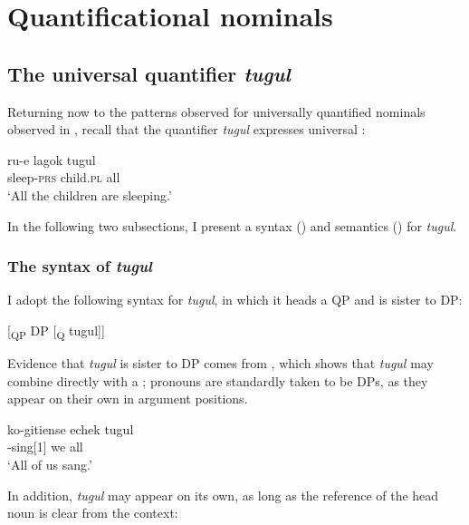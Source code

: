 \documentclass[output=paper]{LSP/langsci}
\begin{document}
\section{Quantificational nominals}
\label{sec:landman:qnominals}

\subsection{The universal quantifier \textit{tugul}}
Returning now to the patterns observed for universally quantified nominals observed in , recall that the quantifier \textit{tugul} expresses universal : 

\begin{exe}
     \gll ru-e lagok tugul \\
          sleep-\textsc{prs} child.\textsc{pl} all\\ 
     \glt ‘All the children are sleeping.’
\end{exe}

 In the following two subsections, I present a syntax () and semantics () for \textit{tugul}.

\subsubsection{The syntax of \textit{tugul}}
\label{sec:landman:tugulsyn}
\noindent I adopt the following syntax for \textit{tugul}, in which it heads a QP and is sister to DP:  

\ea \label{ex:landman:tugultree}
[\textsubscript{QP} DP [\textsubscript{Q} tugul]]  %
\z

 Evidence that \textit{tugul} is sister to DP comes from , which shows that \textit{tugul} may combine directly with a ; pronouns are standardly taken to be DPs, as they appear on their own in argument positions.

\ea \label{ex:landman:tugulpronoun}
    \gll ko-gitiense echek tugul\\ 
	     \pst-sing[1\pl] we all\\ 
    \glt ‘All of us sang.’
\z

 In addition, \textit{tugul} may appear on its own, as long as the reference of the head noun is clear from the context:
\end{document}
